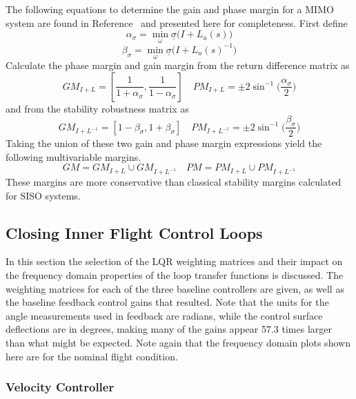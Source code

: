 The following equations to determine the gain and phase margin for a MIMO system are found in Reference\ \cite{lavretskywise.book.2013} and presented here for completeness.
First define
\begin{equation}
  \alpha_{\sigma}=\min_{\omega}\underline{\sigma}\bigr(I+L_{u}(s)\bigr)
\end{equation}
\begin{equation}
  \beta_{\sigma}=\min_{\omega}\underline{\sigma}\bigr(I+L_{u}(s)^{-1}\bigr)
\end{equation}
Calculate the phase margin and gain margin from the return difference matrix as
\begin{equation}
  GM_{I+L}=\left[\frac{1}{1+\alpha_{\sigma}},\frac{1}{1-\alpha_{\sigma}}\right]\quad
  PM_{I+L}=\pm2\sin^{-1}\biggr(\frac{\alpha_{\sigma}}{2}\biggr)
\end{equation}
and from the stability robustness matrix as
\begin{equation}
  GM_{I+L^{-1}}=\left[1-\beta_{\sigma},1+\beta_{\sigma}\right]\quad
  PM_{I+L^{-1}}=\pm2\sin^{-1}\biggr(\frac{\beta_{\sigma}}{2}\biggr)
\end{equation}
Taking the union of these two gain and phase margin expressions yield the following multivariable margins.
\begin{equation}
  GM=GM_{I+L}\cup GM_{I+L^{-1}}\quad
  PM=PM_{I+L}\cup PM_{I+L^{-1}}
\end{equation}
These margins are more conservative than classical stability margins calculated for SISO systems.

\subsection{Closing Inner Flight Control Loops}

In this section the selection of the LQR weighting matrices and their impact on the frequency domain properties of the loop transfer functions is discussed.
The weighting matrices for each of the three baseline controllers are given, as well as the baseline feedback control gains that resulted.
Note that the units for the angle measurements used in feedback are radians, while the control surface deflections are in degrees, making many of the gains appear 57.3 times larger than what might be expected.
Note again that the frequency domain plots shown here are for the nominal flight condition.

\subsubsection*{Velocity Controller}


